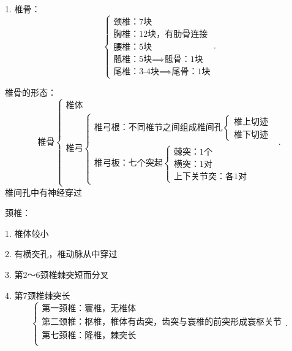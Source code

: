 1. 椎骨：
\[
    \begin{cases}
        \mbox{颈椎：7块}\\ 
        \mbox{胸椎：12块，有肋骨连接}\\ 
        \mbox{腰椎：5块}\\ 
        \mbox{骶椎：5块}\implies \mbox{骶骨：1块}\\
        \mbox{尾椎：3-4块}\implies \mbox{尾骨：1块}
    \end{cases}
.\] 

\begin{notation}
    椎骨的形态：
    \[
        \mbox{椎骨}
        \begin{cases}
            \mbox{椎体}\\ 
            \mbox{椎弓}
            \begin{cases}
                \mbox{椎弓根：不同椎节之间组成椎间孔}
                \begin{cases}
                    \mbox{椎上切迹}\\ 
                    \mbox{椎下切迹}
                \end{cases}\\
                \mbox{椎弓板：七个突起}
                \begin{cases}
                    \mbox{棘突：1个}\\ 
                    \mbox{横突：1对}\\ 
                    \mbox{上下关节突：各1对}
                \end{cases}
            \end{cases}
        \end{cases}
    .\] 
    椎间孔中有神经穿过
\end{notation}

\begin{notation}
    颈椎：

    1. 椎体较小
    
    2. 有横突孔，椎动脉从中穿过

    3. 第2～6颈椎棘突短而分叉

    4. 第7颈椎棘突长
    \[
        \begin{cases}
            \mbox{第一颈椎：寰椎，无椎体}\\ 
            \mbox{第二颈椎：枢椎，椎体有齿突，齿突与寰椎的前突形成寰枢关节}\\ 
            \mbox{第七颈椎：隆椎，棘突长}\\ 
        \end{cases}
    .\] 
\end{notation}

